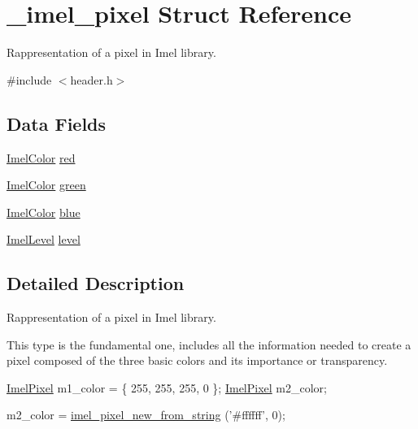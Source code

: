 \hypertarget{struct__imel__pixel}{}\section{\+\_\+imel\+\_\+pixel Struct Reference}
\label{struct__imel__pixel}


Rappresentation of a pixel in Imel library.  




{\ttfamily \#include $<$header.\+h$>$}

\subsection*{Data Fields}
{\bf }\par
\begin{DoxyCompactItemize}
\item 
\hyperlink{header_8h_add1326f75f0c1a7da9f14c2ed4f673e9}{Imel\+Color} \hyperlink{struct__imel__pixel_af491601f44bd0b35d72b77f94940ec65}{red}
\item 
\hyperlink{header_8h_add1326f75f0c1a7da9f14c2ed4f673e9}{Imel\+Color} \hyperlink{struct__imel__pixel_a3776e5a017e15b9dfad83b90b58e982e}{green}
\item 
\hyperlink{header_8h_add1326f75f0c1a7da9f14c2ed4f673e9}{Imel\+Color} \hyperlink{struct__imel__pixel_a1e3b4f517f6a56b353f4ed58f880a08e}{blue}
\item 
\hyperlink{header_8h_a97bc4b146a807c2d83b966983132f4fc}{Imel\+Level} \hyperlink{struct__imel__pixel_a729d8e2d9902ac1a6e2fbbc6f63cf1ed}{level}
\end{DoxyCompactItemize}



\subsection{Detailed Description}
Rappresentation of a pixel in Imel library. 

This type is the fundamental one, includes all the information needed to create a pixel composed of the three basic colors and its importance or transparency.


\begin{DoxyCode}
\hyperlink{struct__imel__pixel}{ImelPixel} m1\_color = \{ 255, 255, 255, 0 \};
\hyperlink{struct__imel__pixel}{ImelPixel} m2\_color;

m2\_color = \hyperlink{pixel_8c_a0d1c4cb614847e8084854f40d05d0eb7}{imel\_pixel\_new\_from\_string} (\textcolor{stringliteral}{'#ffffff'}, 0);
\end{DoxyCode}


